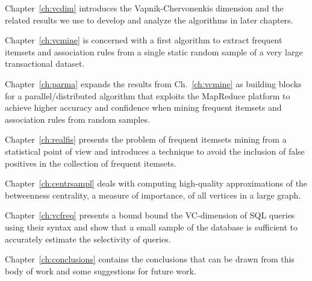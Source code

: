 Chapter~\ref{ch:vcdim} introduces the Vapnik-Chervonenkis dimension and the
related results we use to develop and analyze the algorithms in later
chapters.  

Chapter~\ref{ch:vcmine} is concerned with a first algorithm to extract frequent itemsets
and association rules from a single static random sample of a very large
transactional dataset.

Chapter~\ref{ch:parma} expands the results from Ch.~\ref{ch:vcmine} as building
blocks for a parallel/distributed algorithm that exploits the MapReduce platform
to achieve higher accuracy and confidence when mining frequent
itemsets and association rules from random samples. 



Chapter~\ref{ch:realfis} presents the problem of frequent itemsets mining from a
statistical point of view and introduces a technique to avoid the inclusion
of false positives in the collection of frequent itemsets.


Chapter~\ref{ch:centrsampl} deals with computing high-quality approximations of
the betweenness centrality, a measure of importance, of all vertices in a large
graph.

Chapter~\ref{ch:vcfreq} presents a bound bound the VC-dimension of SQL
queries using their syntax and show that a small sample of the database is
sufficient to accurately estimate the selectivity of queries.

Chapter~\ref{ch:conclusions} contains the conclusions that can be drawn from
this body of work and some suggestions for future work.

